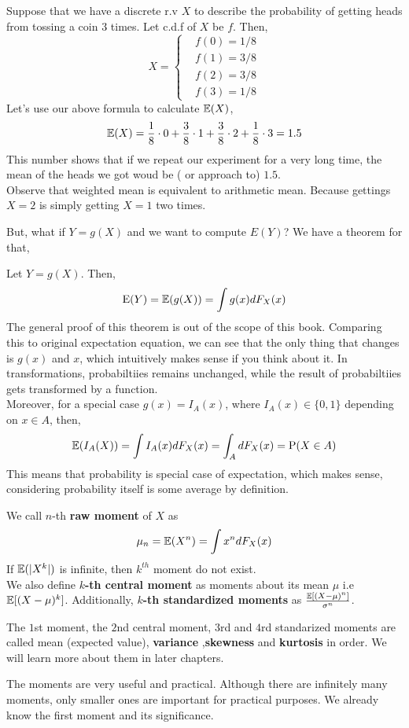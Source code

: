 \begin{example}
    Suppose that we have  a discrete r.v $X$ to describe the probability of getting heads from tossing a coin $3$ times.  Let  c.d.f of $X$ be $f$. Then,
    \[X = \begin{cases}
        &f(0) = 1/8\\
        &f(1) = 3/8 \\
        &f(2) = 3/8 \\
        &f(3) = 1/8
    \end{cases}\]
    Let's use our above formula to calculate ${\mathbb{E}}(X)$,
    \[{\mathbb{E}}(X) =  \frac{1}{8} \cdot 0 + \frac{3}{8} \cdot 1 + \frac{3}{8} \cdot 2 + \frac{1}{8} \cdot 3 = 1.5\]
    This number shows that if we repeat our experiment for a very long time, the mean of the heads we got woud be  ( or approach to) $1.5$.
    \\Observe that weighted mean is equivalent to arithmetic mean. Because gettings $X=2$ is simply getting $X=1$ two times.
\end{example}
\par
\vspace{10cm}
But, what if $Y= g(X)$ and we want to compute $E(Y)$? We have a theorem for that,
\begin{theorem}
    Let $Y = g(X)$. Then,
    \[\operatorname{E}(Y)= {\mathbb{E}} (g(X))= \int g(x) dF_X(x)\]
       The general proof of this theorem is out of the scope of this book. Comparing this to original expectation equation, we can see that the only thing that changes is $g(x)$ and $x$, which intuitively makes sense if you think about it. In transformations, probabiltiies remains unchanged, while the result of probabiltiies gets transformed by a function.
       \\ Moreover, for a special case $g(x) = I_A(x)$, where $I_A(x) \in \{ 0,1\}$ depending on $x \in A$, then,
       \[{\mathbb{E}} (I_A(X)) = \int I_A(x) d F_X(x) = \int_A dF_X(x) = \operatorname{P} (X \in A)\]
       This means that probability is special case of expectation, which makes sense, considering probability itself is some average by definition.
\end{theorem}
\begin{definition}
We call  $n$-th \textbf{ raw moment} of $X$ as 
\[ \mu_n = {\mathbb{E}} (X^n) = \int x^n dF_X(x)\] 
If $ {\mathbb{E}} ( |X^k|)$ is infinite, then $k^{th}$ moment do not exist.\\
We also define \textbf{ $k$-th central moment} as moments about its mean $\mu$ i.e ${\mathbb{E}} [(X - \mu)^k   ]$. Additionally, \textbf{ $k$-th standardized moments} as $\frac{{\mathbb{E}} [ (X - \mu)^n]}{\sigma^n}$.
\par
The $1$st moment, the $2$nd central moment, $3$rd  and $4$rd standarized moments are called mean (expected value), \textbf{variance} ,\textbf{skewness} and \textbf{kurtosis} in order. We will learn more about them in later chapters.

\par 
The moments are very useful and practical. Although there  are infinitely many moments, only smaller ones are important for practical purposes. We already know the first moment and its significance. 
\end{definition}
